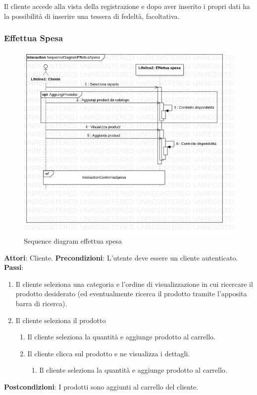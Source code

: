 \documentclass[12pt, a4paper]{report}
\begin{document}
Il cliente accede alla vista della registrazione e dopo aver inserito i propri
dati ha la possibilità di inserire una tessera di fedeltà, facoltativa.

\newpage

\subsubsection{Effettua Spesa}

\begin{figure}[h]
  \centering
  \includegraphics[width=\textwidth]{Use Case Model!Effettua spesa!InteractionEffettuaSpesa!SequenceDiagramEffettuaSpesa_3.png}
  \caption{Sequence diagram effettua spesa}
\end{figure}
\break
\textbf{Attori}: Cliente.\newline
\textbf{Precondizioni}: L'utente deve essere un cliente autenticato. \newline
\textbf{Passi}: 
\begin{enumerate}
\item Il cliente seleziona una categoria e l'ordine di visualizzazione in cui ricercare il prodotto desiderato (ed eventualmente ricerca il prodotto tramite l'apposita barra di ricerca).
\item Il cliente seleziona il prodotto 
\begin{enumerate}
\item Il cliente seleziona la quantità e aggiunge prodotto al carrello.
\item Il cliente clicca sul prodotto e ne visualizza i dettagli.
\begin{enumerate}
\item Il cliente seleziona la quantità e aggiunge prodotto al carrello.
\end{enumerate}
\end{enumerate}
\end{enumerate}
\textbf{Postcondizioni}: I prodotti sono aggiunti al carrello del cliente.
\break 
\end{document}
